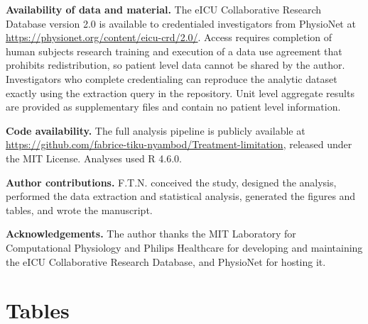 \documentclass[12pt,a4paper]{article}
\begin{document}
\noindent\textbf{Availability of data and material.} The eICU Collaborative Research
Database version 2.0 is available to credentialed investigators from PhysioNet at
\url{https://physionet.org/content/eicu-crd/2.0/}. Access requires completion of human
subjects research training and execution of a data use agreement that prohibits
redistribution, so patient level data cannot be shared by the author. Investigators who
complete credentialing can reproduce the analytic dataset exactly using the extraction
query in the repository. Unit level aggregate results are provided as supplementary
files and contain no patient level information.

\noindent\textbf{Code availability.} The full analysis pipeline is publicly available
at \url{https://github.com/fabrice-tiku-nyambod/Treatment-limitation}, released under
the MIT License. Analyses used R 4.6.0.

\noindent\textbf{Author contributions.} F.T.N. conceived the study, designed the
analysis, performed the data extraction and statistical analysis, generated the figures
and tables, and wrote the manuscript.

\noindent\textbf{Acknowledgements.} The author thanks the MIT Laboratory for
Computational Physiology and Philips Healthcare for developing and maintaining the eICU
Collaborative Research Database, and PhysioNet for hosting it.

\newpage
\section*{Tables}
\end{document}
